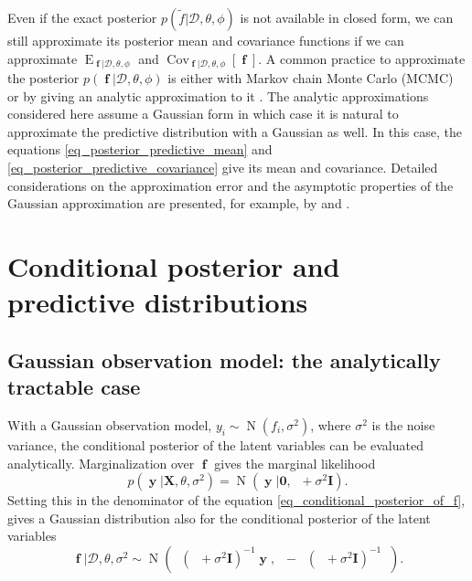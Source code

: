 \documentclass[twoside,11pt]{article}
\DeclareMathOperator{\Kff}{\mathbf{K}_{f,f}}
\DeclareMathOperator{\f}{\mathbf{f}}
\DeclareMathOperator{\y}{\mathbf{y}}
\DeclareMathOperator{\N}{N}
\newcommand{\mb}{\mathbf}
\DeclareMathOperator{\E}{E}
\DeclareMathOperator{\COV}{Cov}
\begin{document}
Even if the exact posterior $p(\tilde{f}|\mathcal{D},\theta,\phi)$ is
not available in closed form, we can still approximate its posterior
mean and covariance functions if we can approximate
$\E_{\f|\mathcal{D},\theta,\phi}$ and
$\COV_{\f|\mathcal{D},\theta,\phi}[\f]$. A common practice to
approximate the posterior $p(\f|\mathcal{D},\theta,\phi)$ is either
with Markov chain Monte Carlo (MCMC)
\citep[e.g.][]{Neal:1997,Neal:1998,Diggle+Tawn+Moyeed:1998,Kuss+Rasmussen:2005,Christensen+Roberts+Skold:2006}
or by giving an analytic approximation to it
\citep[e.g.][]{Williams+Barber:1998,Gibbs+MacKay:2000,Minka:2001,Csato+Opper:2002,Rue+Martino+Chopin:2009}.
The analytic approximations considered here assume a Gaussian form in
which case it is natural to approximate the predictive distribution
with a Gaussian as well.  In this case, the equations
\eqref{eq_posterior_predictive_mean} and
\eqref{eq_posterior_predictive_covariance} give its mean and
covariance. Detailed considerations on the approximation error and the
asymptotic properties of the Gaussian approximation are presented, for
example, by \citet{Rue+Martino+Chopin:2009} and
\citet{Vanhatalo+Pietilainen+Vehtari:2010}.

\section{Conditional posterior and predictive distributions}\label{sec_cond_post_of_latent}

\subsection{Gaussian observation model: the analytically tractable case}
\label{sec:gauss-observ-model}

With a Gaussian observation model, $y_i \sim \N(f_i, \sigma^2)$, where
$\sigma^2$ is the noise variance, the conditional posterior of the
latent variables can be evaluated analytically. Marginalization over
$\f$ gives the marginal likelihood
%
\begin{equation}\label{eq_marginal_likelihood_gaussian_case}
p(\y|\mb{X},\theta, \sigma^2) = \N(\y|\mb{0}, \Kff + \sigma^2\mb{I}).
\end{equation}
%
Setting this in the denominator of the equation
\eqref{eq_conditional_posterior_of_f}, gives a Gaussian distribution
also for the conditional posterior of the latent variables
%
\begin{equation}\label{eq_posterior_in_gaussian_case}
\f|\mathcal{D},\theta, \sigma^2 \sim \N(\Kff(\Kff + \sigma^2\mb{I})^{-1}\y, \Kff - \Kff(\Kff + \sigma^2\mb{I})^{-1}\Kff).
\end{equation}
\end{document}
